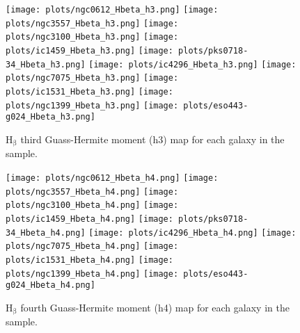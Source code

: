\documentclass[fleqn,usenatbib,useAMS]{mnras}
\begin{document}
        \begin{figure*}
            \centering
            \texttt{[image: plots/ngc0612\_Hbeta\_h3.png]}
            \texttt{[image: plots/ngc3557\_Hbeta\_h3.png]}
            \texttt{[image: plots/ngc3100\_Hbeta\_h3.png]}
            \texttt{[image: plots/ic1459\_Hbeta\_h3.png]}
            \texttt{[image: plots/pks0718-34\_Hbeta\_h3.png]}
            \texttt{[image: plots/ic4296\_Hbeta\_h3.png]}
            \texttt{[image: plots/ngc7075\_Hbeta\_h3.png]}
            \texttt{[image: plots/ic1531\_Hbeta\_h3.png]}
            \texttt{[image: plots/ngc1399\_Hbeta\_h3.png]}
            \texttt{[image: plots/eso443-g024\_Hbeta\_h3.png]}
            \caption{H$_\mathrm{\beta}$ third Guass-Hermite moment (h3) map for each galaxy in the sample.}
            \label{fig:Hbeta_h3}
        \end{figure*}


        \begin{figure*}
            \centering
            \texttt{[image: plots/ngc0612\_Hbeta\_h4.png]}
            \texttt{[image: plots/ngc3557\_Hbeta\_h4.png]}
            \texttt{[image: plots/ngc3100\_Hbeta\_h4.png]}
            \texttt{[image: plots/ic1459\_Hbeta\_h4.png]}
            \texttt{[image: plots/pks0718-34\_Hbeta\_h4.png]}
            \texttt{[image: plots/ic4296\_Hbeta\_h4.png]}
            \texttt{[image: plots/ngc7075\_Hbeta\_h4.png]}
            \texttt{[image: plots/ic1531\_Hbeta\_h4.png]}
            \texttt{[image: plots/ngc1399\_Hbeta\_h4.png]}
            \texttt{[image: plots/eso443-g024\_Hbeta\_h4.png]}
            \caption{H$_\mathrm{\beta}$ fourth Guass-Hermite moment (h4) map for each galaxy in the sample.}
            \label{fig:Hbeta_h4}
        \end{figure*}
\end{document}
